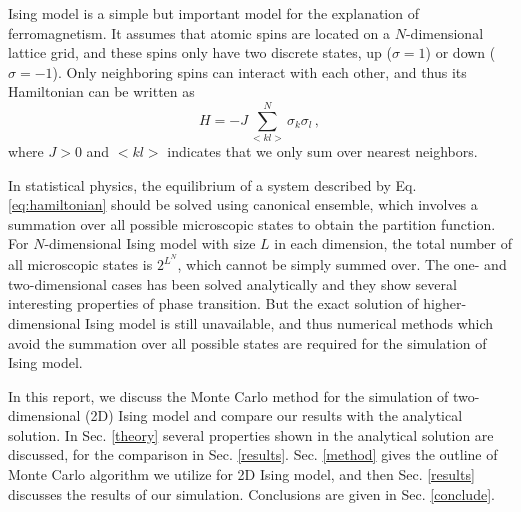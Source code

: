 Ising model is a simple but important model for the explanation of ferromagnetism. 
It assumes that atomic spins are located on a $N$-dimensional lattice grid, 
and these spins only have two discrete states, up ($\sigma=1$) or down ($\sigma=-1$). 
Only neighboring spins can interact with each other, and thus its Hamiltonian can be written as 
\begin{equation}\label{eq:hamiltonian}
H=-J\sum_{<kl>}^{N}\sigma_k\sigma_l\,,
\end{equation}
where $J>0$ and $<kl>$ indicates that we only sum over nearest neighbors. 
\par
In statistical physics, the equilibrium of a system described by Eq. \ref{eq:hamiltonian} should be solved using canonical ensemble, 
which involves a summation over all possible microscopic states to obtain the partition function. 
For $N$-dimensional Ising model with size $L$ in each dimension, 
the total number of all microscopic states is $2^{L^N}$, which cannot be simply summed over. 
The one- and two-dimensional cases has been solved analytically and they show several interesting properties of phase transition. 
But the exact solution of higher-dimensional Ising model is still unavailable, 
and thus numerical methods which avoid the summation over all possible states are required for the simulation of Ising model. 
\par
In this report, we discuss the Monte Carlo method for the simulation of two-dimensional (2D) Ising model 
and compare our results with the analytical solution. 
In Sec. \ref{theory} several properties shown in the analytical solution are discussed, for the comparison in Sec. \ref{results}. 
Sec. \ref{method} gives the outline of Monte Carlo algorithm we utilize for 2D Ising model, 
and then Sec. \ref{results} discusses the results of our simulation. 
Conclusions are given in Sec. \ref{conclude}. 
